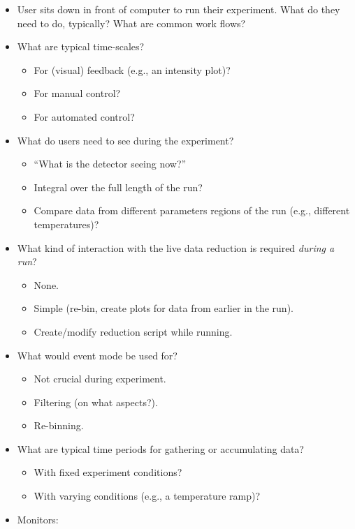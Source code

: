 \documentclass[a4paper,english,numbers=noenddot,bibliography=totoc,chapterprefix=on,DIV=12]{scrartcl}
\begin{document}
\begin{itemize}
  \item User sits down in front of computer to run their experiment.
    What do they need to do, typically?
    What are common work flows?
  \item What are typical time-scales?
    \begin{itemize}
      \item For (visual) feedback (e.g., an intensity plot)?
      \item For manual control?
      \item For automated control?
    \end{itemize}
  \item What do users need to see during the experiment?
    \begin{itemize}
      \item ``What is the detector seeing now?''
      \item Integral over the full length of the run?
      \item Compare data from different parameters regions of the run (e.g., different temperatures)?
    \end{itemize}
  \item What kind of interaction with the live data reduction is required \emph{during a run}?
    \begin{itemize}
      \item None.
      \item Simple (re-bin, create plots for data from earlier in the run).
      \item Create/modify reduction script while running.
    \end{itemize}
  \item What would event mode be used for?
    \begin{itemize}
      \item Not crucial during experiment.
      \item Filtering (on what aspects?).
      \item Re-binning.
    \end{itemize}
  \item What are typical time periods for gathering or accumulating data?
    \begin{itemize}
      \item With fixed experiment conditions?
      \item With varying conditions (e.g., a temperature ramp)?
    \end{itemize}
  \item Monitors:

\end{itemize}
\end{document}
